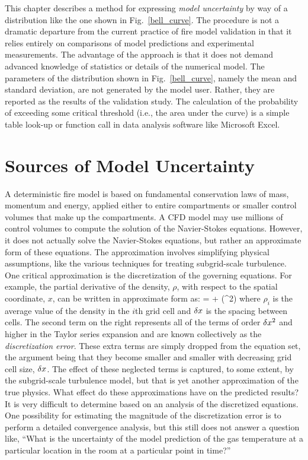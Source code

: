 This chapter describes a method for expressing {\em model uncertainty} by way of a distribution like the one shown in Fig.~\ref{bell_curve}. The procedure is not a dramatic departure from the current practice of fire model validation in that it relies entirely on comparisons of model predictions and experimental measurements. The advantage of the approach is that it does not demand advanced knowledge of statistics or details of the numerical model. The parameters of the distribution shown in Fig.~\ref{bell_curve}, namely the mean and standard deviation, are not generated by the model user. Rather, they are reported as the results of the validation study. The calculation of the probability of exceeding some critical threshold (i.e., the area under the curve) is a simple table look-up or function call in data analysis software like Microsoft Excel\textregistered.



\section{Sources of Model Uncertainty}

A deterministic fire model is based on fundamental conservation laws of mass, momentum and energy,
applied either to entire compartments or smaller control
volumes that make up the compartments. A CFD model may use millions of control volumes to compute the
solution of the Navier-Stokes equations.
However, it does not actually solve the Navier-Stokes equations, but rather an approximate form of these equations.
The approximation involves simplifying
physical assumptions, like the various techniques for treating subgrid-scale turbulence.
One critical approximation is the discretization of the governing equations. For example,
the partial derivative of the density, $\rho$,
with respect to the spatial coordinate, $x$, can be written in approximate form as:
\be {} =  + (\dx^2) \ee
where $\rho_i$ is the average value of the density in the $i$th grid cell and $\delta x$ is the spacing between cells.
The second term on the right represents all of the terms of order $\delta x^2$ and higher in the Taylor
series expansion and are known collectively as the
{\em discretization error}. These extra terms are simply dropped from
the equation set, the argument being that they become smaller and smaller with decreasing grid cell size, $\delta x$.
The effect of these neglected terms is captured, to
some extent, by the subgrid-scale turbulence model, but that is yet another approximation of the true physics.
What effect do these approximations have on
the predicted results? It is very difficult to determine based on an analysis of the discretized equations.
One possibility for estimating
the magnitude of the discretization error is to perform a detailed
convergence analysis, but this still does not answer a
question like, ``What is the uncertainty of the model prediction of the gas
temperature at a particular location in the room at a particular point in time?''


